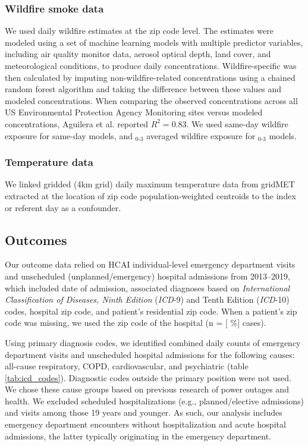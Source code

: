 \documentclass[../main.tex]{subfiles}
\begin{document}
\subsubsection{Wildfire smoke data}
We used daily wildfire \PM estimates at the zip code level.\citep{aguilera2023novel} The estimates were modeled using a set of machine learning models with multiple predictor variables, including air quality monitor data, aerosol optical depth, land cover, and meteorological conditions, to produce daily \PM concentrations.\citep{aguilera2023novel} Wildfire-specific \PM was then calculated by imputing non-wildfire-related \PM concentrations using a chained random forest algorithm and taking the difference between these values and modeled \PM concentrations. When comparing the observed \PM concentrations across all US Environmental Protection Agency Monitoring sites versus modeled \PM concentrations, Aguilera et al. reported $R^2 = 0.83$.  We used same-day wildfire \PM exposure for same-day models, and $_{0\text{-}3}$ averaged wildfire \PM exposure for $_{0\text{-}3}$ models. 

\subsubsection{Temperature data}
We linked gridded (4km grid) daily maximum temperature data from gridMET extracted at the location of zip code population-weighted centroids to the index or referent day as a confounder.\citep{abatzoglou2013development} 

\subsection{Outcomes}
Our outcome data relied on HCAI individual-level emergency department visits and unscheduled (unplanned/emergency) hospital admissions from 2013--2019, which included date of admission, associated diagnoses based on \textit{International Classification of Diseases, Ninth Edition} (\textit{ICD}-9) and Tenth Edition (\textit{ICD}-10) codes, hospital zip code, and patient’s residential zip code. When a patient's zip code was missing, we used the zip code of the hospital (n = \missingzipcases{} [ \percmissingzip{}\%] cases). 

Using primary diagnosis codes, we identified combined daily counts of emergency department visits and unscheduled hospital admissions for the following causes: all-cause respiratory, COPD, cardiovascular, and psychiatric (table \ref{tab:icd_codes}). Diagnostic codes outside the primary position were not used. We chose these cause groups based on previous research of power outages and health.\citep{casey2020power} We excluded scheduled hospitalizations (e.g., planned/elective admissions) and visits among those 19 years and younger. As such, our analysis includes emergency department encounters without hospitalization and acute hospital admissions, the latter typically originating in the emergency department.
\end{document}
